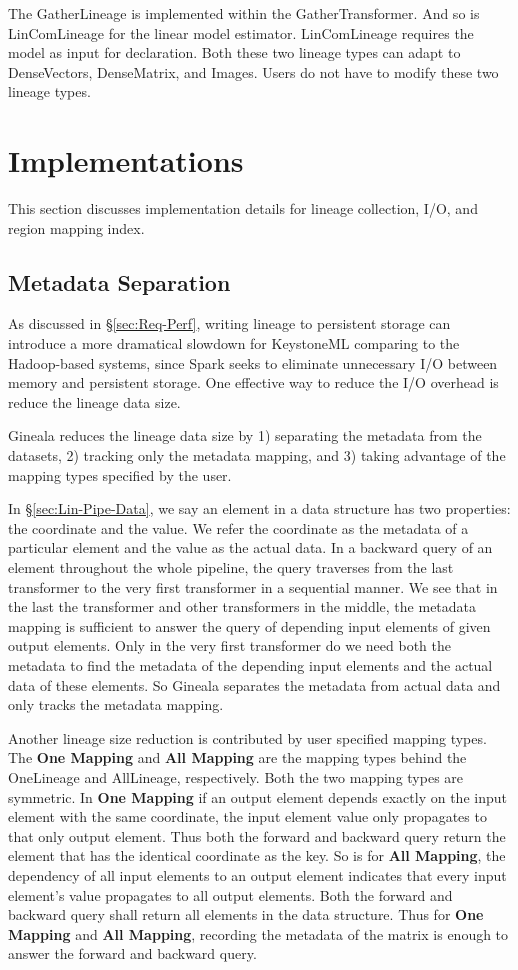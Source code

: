 \documentclass{sig-alternate}
\begin{document}
The GatherLineage is implemented within the GatherTransformer.
And so is LinComLineage for the linear model estimator. LinComLineage requires the model as input for declaration.
Both these two lineage types can adapt to DenseVectors, DenseMatrix, and Images. 
Users do not have to modify these two lineage types. 

\section{Implementations}
\label{sec:Impl}
This section discusses implementation details for lineage collection, I/O, and region mapping index.

\subsection{Metadata Separation}
As discussed in \S\ref{sec:Req-Perf}, writing lineage to persistent storage can introduce a more dramatical slowdown for KeystoneML comparing
to the Hadoop-based systems, since Spark seeks to eliminate unnecessary I/O between memory and persistent storage.
One effective way to reduce the I/O overhead is reduce the lineage data size.

Gineala reduces the lineage data size by 1) separating the metadata from the datasets, 2) tracking only the metadata mapping, 
and 3) taking advantage of the mapping types specified by the user.

In \S\ref{sec:Lin-Pipe-Data}, we say an element in a data structure has two properties: the coordinate and the value.
We refer the coordinate as the metadata of a particular element and the value as the actual data. 
In a backward query of an element throughout the whole pipeline, the query traverses from the last transformer
to the very first transformer in a sequential manner. 
We see that in the last the transformer and other transformers in the middle, the metadata mapping is sufficient to answer
the query of depending input elements of given output elements. Only in the very first transformer do we need both the metadata
to find the metadata of the depending input elements and the actual data of these elements.
So Gineala separates the metadata from actual data and only tracks the metadata mapping.

Another lineage size reduction is contributed by user specified mapping types. 
The {\bf One Mapping} and {\bf All Mapping} are the mapping types behind the OneLineage and AllLineage, respectively.
Both the two mapping types are symmetric.
In {\bf One Mapping} if an output element depends exactly on the input element with the same coordinate, 
the input element value only propagates to that only output element. 
Thus both the forward and backward query return the element that has the identical coordinate as the key.
So is for {\bf All Mapping}, the dependency of all input elements to an output element indicates that every input element's value propagates to all output elements.
Both the forward and backward query shall return all elements in the data structure.
Thus for {\bf One Mapping} and {\bf All Mapping}, recording the metadata of the matrix is enough to answer the forward and backward query.
\end{document}
